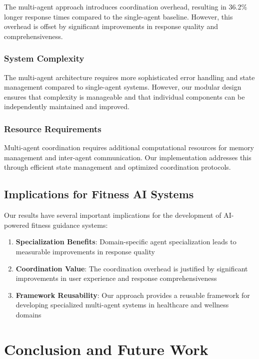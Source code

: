 \documentclass[conference]{IEEEtran}
\begin{document}
The multi-agent approach introduces coordination overhead, resulting in 36.2\% longer response times compared to the single-agent baseline. However, this overhead is offset by significant improvements in response quality and comprehensiveness.

\subsubsection{System Complexity}

The multi-agent architecture requires more sophisticated error handling and state management compared to single-agent systems. However, our modular design ensures that complexity is manageable and that individual components can be independently maintained and improved.

\subsubsection{Resource Requirements}

Multi-agent coordination requires additional computational resources for memory management and inter-agent communication. Our implementation addresses this through efficient state management and optimized coordination protocols.

\subsection{Implications for Fitness AI Systems}

Our results have several important implications for the development of AI-powered fitness guidance systems:

\begin{enumerate}
\item \textbf{Specialization Benefits}: Domain-specific agent specialization leads to measurable improvements in response quality
\item \textbf{Coordination Value}: The coordination overhead is justified by significant improvements in user experience and response comprehensiveness
\item \textbf{Framework Reusability}: Our approach provides a reusable framework for developing specialized multi-agent systems in healthcare and wellness domains
\end{enumerate}

\section{Conclusion and Future Work}
\end{document}
